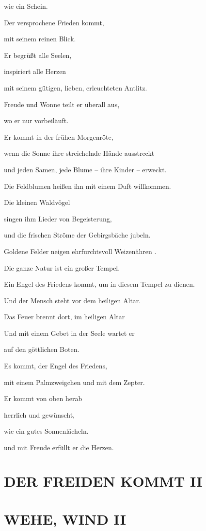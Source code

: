 \documentclass[11pt,a5paper,twoside]{article}
\begin{document}
wie ein Schein.

Der versprochene Frieden kommt,

mit seinem reinen Blick.

Er begrüßt alle Seelen,

inspiriert alle Herzen

mit seinem gütigen, lieben, erleuchteten Antlitz.

Freude und Wonne teilt er überall aus,

wo er nur vorbeiläuft.

Er kommt in der frühen Morgenröte,

wenn die Sonne ihre streichelnde Hände ausstreckt

und jeden Samen, jede Blume -- ihre Kinder -- erweckt.

Die Feldblumen heißen ihn mit einem Duft willkommen.

Die kleinen Waldvögel

singen ihm Lieder von Begeisterung,

und die frischen Ströme der Gebirgsbäche jubeln.

Goldene Felder neigen ehrfurchtsvoll Weizenähren .

Die ganze Natur ist ein großer Tempel.

Ein Engel des Friedens kommt, um in diesem Tempel zu dienen.

Und der Mensch steht vor dem heiligen Altar.

Das Feuer brennt dort, im heiligen Altar

Und mit einem Gebet in der Seele wartet er 

auf den göttlichen Boten.

Es kommt, der Engel des Friedens,

mit einem Palmzweigchen und mit dem Zepter.

Er kommt von oben herab

herrlich und gewünscht,

wie ein gutes Sonnenlächeln.

und mit Freude erfüllt er die Herzen.

\section[Der Frieden kommt II]{DER FREIDEN KOMMT II}

\section[Wehe, Wind II]{WEHE, WIND II}
\end{document}

